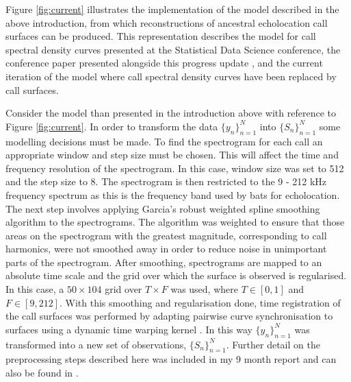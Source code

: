 \documentclass[]{article}
\begin{document}
Figure \ref{fig:current} illustrates the implementation of the model described in the above introduction, from which reconstructions of ancestral echolocation call surfaces can be produced. This representation describes the model for call spectral density curves presented at the Statistical Data Science conference, the conference paper presented alongside this progress update \cite{meagher2017pgp}, and the current iteration of the model where call spectral density curves have been replaced by call surfaces.

Consider the model than presented in the introduction above with reference to Figure \ref{fig:current}. In order to transform the data \(\{y_n\}_{n=1}^{N}\) into \(\{S_n\}_{n = 1}^N\) some modelling decisions must be made. To find the spectrogram for each call an appropriate window and step size must be chosen. This will affect the time and frequency resolution of the spectrogram. In this case, window size was set to 512 and the step size to 8. The spectrogram is then restricted to the 9 - 212 kHz frequency spectrum as this is the frequency band used by bats for echolocation. The next step involves applying Garcia's robust weighted spline smoothing algorithm \cite{garcia2010robust} to the spectrograms. The algorithm was weighted to ensure that those areas on the spectrogram with the greatest magnitude, corresponding to call harmonics, were not smoothed away in order to reduce noise in unimportant parts of the spectrogram. After smoothing, spectrograms are mapped to an absolute time scale and the grid over which the surface is observed is regularised. In this case, a \(50 \times 104\) grid over \(T \times F\) was used, where \(T \in [0,1]\) and \(F \in  [9, 212]\). With this smoothing and regularisation done, time registration of the call surfaces was performed by adapting pairwise curve synchronisation \cite{tang2008pairwise} to surfaces using a dynamic time warping kernel \cite{damoulas2010bayesian}. In this way \(\{y_n\}_{n=1}^{N}\) was transformed into a new set of observations, \(\{S_n\}_{n = 1}^N\). Further detail on the preprocessing steps described here was included in my 9 month report and can also be found in \cite{pigoli2015analysis}.
\end{document}

